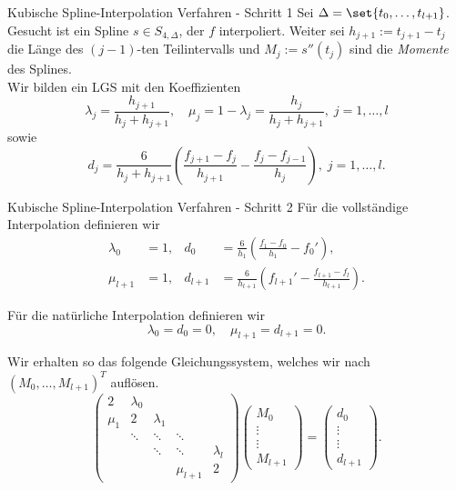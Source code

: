 \begin{karte}{Kubische Spline-Interpolation Verfahren - Schritt 1}
	Sei \( \Delta = \set{t_0,\ldots, t_{l+1}} \). Gesucht ist ein Spline \( s\in S_{4,\Delta} \), 
	der \(f\) interpoliert.
	Weiter sei \( h_{j+1} := t_{j+1} - t_j \) die Länge des \( (j-1) \)-ten Teilintervalls 
	und \( M_j := s''(t_j) \) sind die \textit{Momente} des Splines.\\
	Wir bilden ein LGS mit den Koeffizienten 
	\[ \lambda_j = \frac{h_{j+1}}{h_j + h_{j+1}}, \quad \mu_j = 1 - \lambda_j = \frac{h_j}{h_j + h_{j+1}}, \;j = 1,\ldots, l \]
	sowie 
	\[ d_j = \frac{6}{h_j + h_{j+1}} \left( \frac{f_{j+1} - f_j}{h_{j+1}} - \frac{f_j - f_{j-1}}{h_j} \right), \;j = 1,\ldots, l. \]
\end{karte}

\begin{karte}{Kubische Spline-Interpolation Verfahren - Schritt 2}
	Für die vollständige Interpolation definieren wir 
	\begin{align*}
		\lambda_0 &= 1, &d_0 &= \frac{6}{h_1}\left( \frac{f_1 - f_0}{h_1} - f_0' \right), \\
		\mu_{l+1} &= 1, &d_{l+1} &= \frac{6}{h_{l+1}} \left( f_{l+1}' - \frac{f_{l+1} - f_l}{h_{l+1}} \right).
	\end{align*}

	Für die natürliche Interpolation definieren wir 
	\[ \lambda_0 = d_0 = 0, \quad \mu_{l+1} = d_{l+1} = 0. \]

	Wir erhalten so das folgende Gleichungssystem, welches wir nach 
	\( (M_0,\ldots, M_{l+1})^T \) auflösen.
	\[ \begin{pmatrix}
		2 & \lambda_0 & \\
		\mu_1 & 2 & \lambda_1 \\
		& \ddots & \ddots & \ddots \\
		& & \ddots & \ddots & \lambda_l \\
		& & & \mu_{l+1} & 2
	\end{pmatrix} \begin{pmatrix}
		M_0 \\ \vdots \\ \vdots \\ M_{l+1}
	\end{pmatrix} = \begin{pmatrix}
		d_0 \\ \vdots \\ \vdots \\ d_{l+1}
	\end{pmatrix}. \]
\end{karte}

